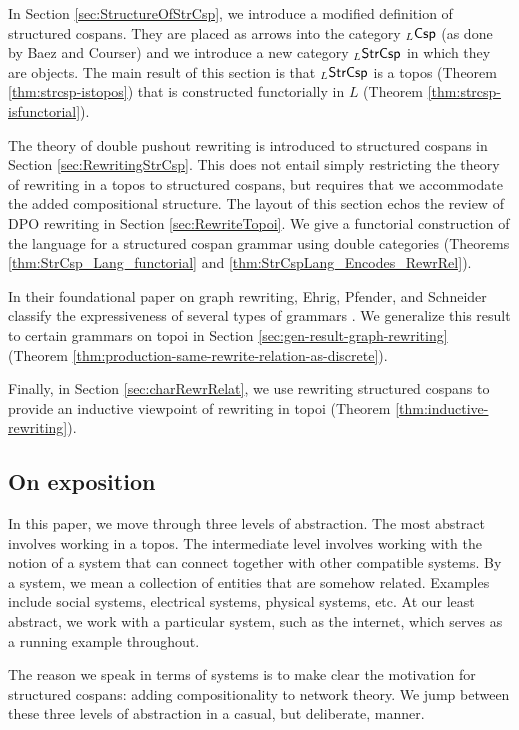 \documentclass[oneside]{amsart}
\begin{document}
In Section \ref{sec:StructureOfStrCsp}, we
introduce a modified definition of structured
cospans. They are placed as arrows into the
category $ _L\mathsf{Csp} $ (as done by Baez and Courser)
and we introduce a new category $ _L\mathsf{StrCsp} $ in
which they are objects. The main result of this
section is that $ _L\mathsf{StrCsp} $ is a topos (Theorem
\ref{thm:strcsp-istopos}) that is
constructed functorially in $ L $ (Theorem
\ref{thm:strcsp-isfunctorial}).

The theory of double pushout rewriting is
introduced to structured cospans in Section
\ref{sec:RewritingStrCsp}. This does not entail
simply restricting the theory of rewriting in a
topos to structured cospans, but requires that we
accommodate the added compositional
structure. The layout of this section echos the
review of DPO rewriting in Section
\ref{sec:RewriteTopoi}. We give a functorial
construction of the language for a structured
cospan grammar using double categories (Theorems
\ref{thm:StrCsp_Lang_functorial} and
\ref{thm:StrCspLang_Encodes_RewrRel}).

In their foundational paper on graph rewriting,
Ehrig, Pfender, and Schneider classify the expressiveness of
several types of grammars
\parencite[Prop.~3.3]{Ehrig_GraphGram}. We generalize
this result to certain grammars on topoi in
Section \ref{sec:gen-result-graph-rewriting}
(Theorem
\ref{thm:production-same-rewrite-relation-as-discrete}).

Finally, in Section \ref{sec:charRewrRelat}, we
use rewriting structured cospans to provide an
inductive viewpoint of rewriting in topoi (Theorem
\ref{thm:inductive-rewriting}). 

\subsection{On exposition}
\label{sec:word-about-expos}

In this paper, we move through three levels of
abstraction. The most abstract involves working
in a topos.  The intermediate level
involves working with the notion of a system
that can connect together with other compatible
systems. By a system, we mean a collection of
entities that are somehow related. Examples
include social systems, electrical systems,
physical systems, etc.  At our least
abstract, we work with a particular system, such
as the internet, which serves as a running example
throughout.

The reason we speak in terms of systems is to
make clear the motivation for structured cospans:
adding compositionality to network theory.  We
jump between these three levels of abstraction in
a casual, but deliberate, manner. 
\end{document}
